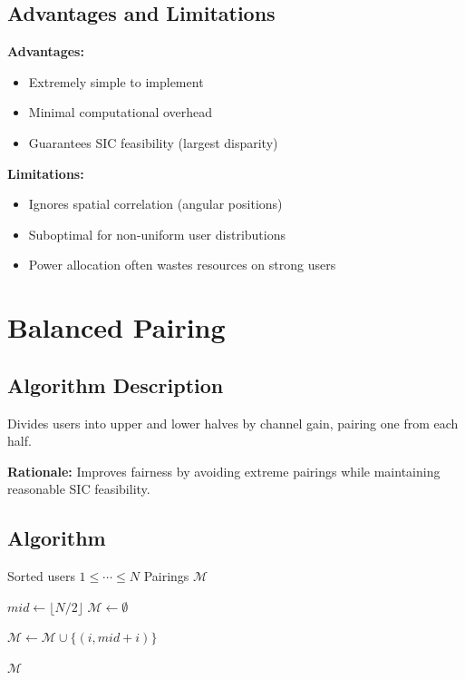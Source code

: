 \subsection{Advantages and Limitations}

\textbf{Advantages:}
\begin{itemize}
    \item Extremely simple to implement
    \item Minimal computational overhead
    \item Guarantees SIC feasibility (largest disparity)
\end{itemize}

\textbf{Limitations:}
\begin{itemize}
    \item Ignores spatial correlation (angular positions)
    \item Suboptimal for non-uniform user distributions
    \item Power allocation often wastes resources on strong users
\end{itemize}

\section{Balanced Pairing}

\subsection{Algorithm Description}

Divides users into upper and lower halves by channel gain, pairing one from each half.

\textbf{Rationale:} Improves fairness by avoiding extreme pairings while maintaining reasonable SIC feasibility.

\subsection{Algorithm}

\begin{algorithm}[H]
\caption{Balanced Pairing}
\label{alg:balanced}
\begin{algorithmic}[1]
\Require Sorted users $1 \leq \cdots \leq N$
\Ensure Pairings $\mathcal{M}$

\State $mid \gets \lfloor N/2 \rfloor$
\State $\mathcal{M} \gets \emptyset$

    \State $\mathcal{M} \gets \mathcal{M} \cup \{(i, mid + i)\}$
\EndFor

\State \Return $\mathcal{M}$
\end{algorithmic}
\end{algorithm}

